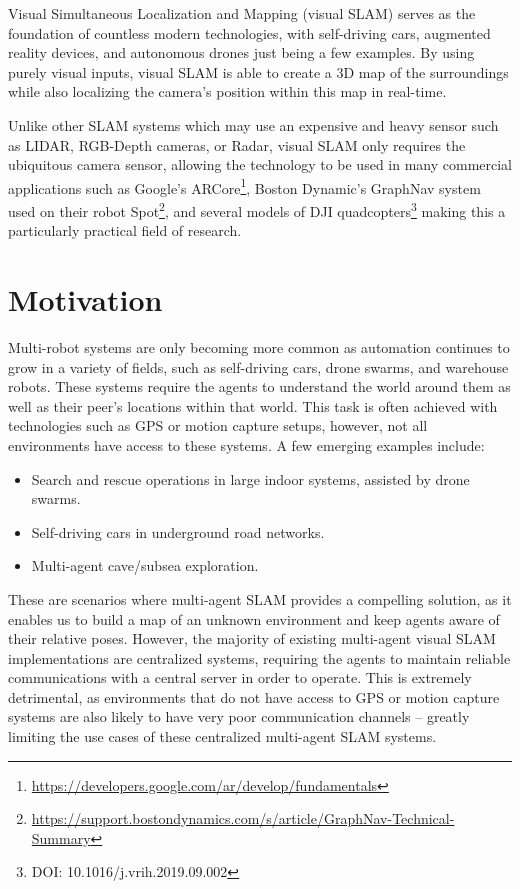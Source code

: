 
\label{sec:introduction}
Visual Simultaneous Localization and Mapping (visual SLAM) serves as the foundation of countless modern technologies, with self-driving cars, augmented reality devices, and autonomous drones just being a few examples. By using purely visual inputs, visual SLAM is able to create a 3D map of the surroundings while also localizing the camera's position within this map in real-time.

Unlike other SLAM systems which may use an expensive and heavy sensor such as LIDAR, RGB-Depth cameras, or Radar, visual SLAM only requires the ubiquitous camera sensor, allowing the technology to be used in many commercial applications such as Google's ARCore\footnote[1]{\url{https://developers.google.com/ar/develop/fundamentals}}, Boston Dynamic's GraphNav system used on their robot Spot\footnote[2]{\url{https://support.bostondynamics.com/s/article/GraphNav-Technical-Summary}}, and several models of DJI quadcopters\footnote[3]{DOI: 10.1016/j.vrih.2019.09.002} making this a particularly practical field of research.

\section{Motivation}
\label{sec:motivation}
Multi-robot systems are only becoming more common as automation continues to grow in a variety of fields, such as self-driving cars, drone swarms, and warehouse robots. These systems require the agents to understand the world around them as well as their peer's locations within that world. This task is often achieved with technologies such as GPS or motion capture setups, however, not all environments have access to these systems. A few emerging examples include: \noparskip
\smallbreak

{
    \begin{itemize}[nosep]
        \item Search and rescue operations in large indoor systems, assisted by drone swarms.
        \item Self-driving cars in underground road networks.
        \item Multi-agent cave/subsea exploration.
    \end{itemize}
}

These are scenarios where multi-agent SLAM provides a compelling solution, as it enables us to build a map of an unknown environment and keep agents aware of their relative poses. However, the majority of existing multi-agent visual SLAM implementations are centralized systems, requiring the agents to maintain reliable communications with a central server in order to operate. This is extremely detrimental, as environments that do not have access to GPS or motion capture systems are also likely to have very poor communication channels – greatly limiting the use cases of these centralized multi-agent SLAM systems.

